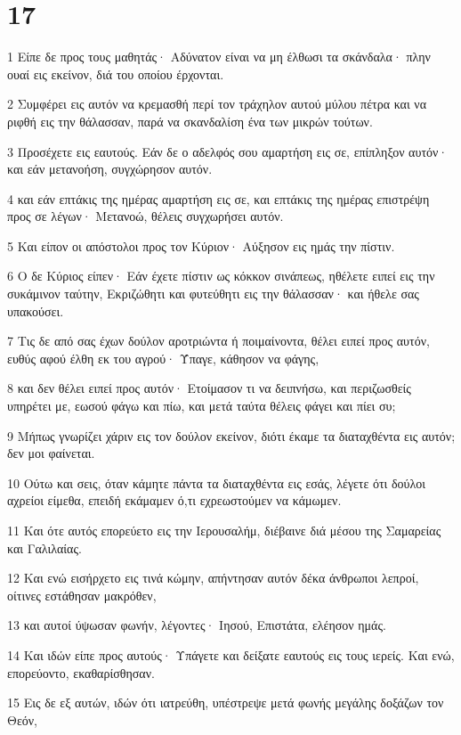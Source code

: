 \chapter{17}

\par 1 Είπε δε προς τους μαθητάς· Αδύνατον είναι να μη έλθωσι τα σκάνδαλα· πλην ουαί εις εκείνον, διά του οποίου έρχονται.
\par 2 Συμφέρει εις αυτόν να κρεμασθή περί τον τράχηλον αυτού μύλου πέτρα και να ριφθή εις την θάλασσαν, παρά να σκανδαλίση ένα των μικρών τούτων.
\par 3 Προσέχετε εις εαυτούς. Εάν δε ο αδελφός σου αμαρτήση εις σε, επίπληξον αυτόν· και εάν μετανοήση, συγχώρησον αυτόν.
\par 4 και εάν επτάκις της ημέρας αμαρτήση εις σε, και επτάκις της ημέρας επιστρέψη προς σε λέγων· Μετανοώ, θέλεις συγχωρήσει αυτόν.
\par 5 Και είπον οι απόστολοι προς τον Κύριον· Αύξησον εις ημάς την πίστιν.
\par 6 Ο δε Κύριος είπεν· Εάν έχετε πίστιν ως κόκκον σινάπεως, ηθέλετε ειπεί εις την συκάμινον ταύτην, Εκριζώθητι και φυτεύθητι εις την θάλασσαν· και ήθελε σας υπακούσει.
\par 7 Τις δε από σας έχων δούλον αροτριώντα ή ποιμαίνοντα, θέλει ειπεί προς αυτόν, ευθύς αφού έλθη εκ του αγρού· Ύπαγε, κάθησον να φάγης,
\par 8 και δεν θέλει ειπεί προς αυτόν· Ετοίμασον τι να δειπνήσω, και περιζωσθείς υπηρέτει με, εωσού φάγω και πίω, και μετά ταύτα θέλεις φάγει και πίει συ;
\par 9 Μήπως γνωρίζει χάριν εις τον δούλον εκείνον, διότι έκαμε τα διαταχθέντα εις αυτόν; δεν μοι φαίνεται.
\par 10 Ούτω και σεις, όταν κάμητε πάντα τα διαταχθέντα εις εσάς, λέγετε ότι δούλοι αχρείοι είμεθα, επειδή εκάμαμεν ό,τι εχρεωστούμεν να κάμωμεν.
\par 11 Και ότε αυτός επορεύετο εις την Ιερουσαλήμ, διέβαινε διά μέσου της Σαμαρείας και Γαλιλαίας.
\par 12 Και ενώ εισήρχετο εις τινά κώμην, απήντησαν αυτόν δέκα άνθρωποι λεπροί, οίτινες εστάθησαν μακρόθεν,
\par 13 και αυτοί ύψωσαν φωνήν, λέγοντες· Ιησού, Επιστάτα, ελέησον ημάς.
\par 14 Και ιδών είπε προς αυτούς· Υπάγετε και δείξατε εαυτούς εις τους ιερείς. Και ενώ, επορεύοντο, εκαθαρίσθησαν.
\par 15 Εις δε εξ αυτών, ιδών ότι ιατρεύθη, υπέστρεψε μετά φωνής μεγάλης δοξάζων τον Θεόν,
